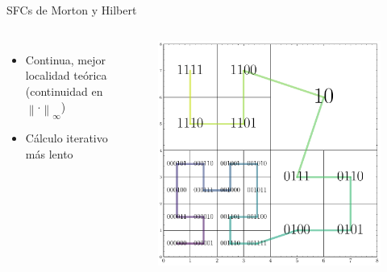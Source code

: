 \documentclass[aspectratio=169]{beamer}
\begin{document}
\begin{frame}{SFCs de Morton y Hilbert}
\begin{columns}
            \begin{itemize}
                \item Continua, mejor localidad teórica (continuidad en ${\left\lVert \cdot \right\rVert}_\infty$)
                \item Cálculo iterativo más lento
            \end{itemize}            
            \begin{figure}
                \includegraphics[scale=0.27]{img/hilbert_quadtree.pdf}
            \end{figure}
        \end{columns}
\end{frame}
\end{document}
